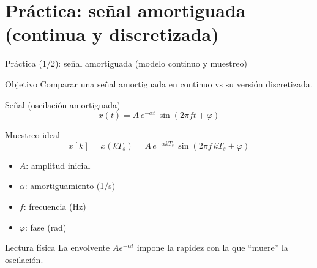 \documentclass[aspectratio=169,10pt]{beamer}
\newcommand{\importantbox}[2][Importante]{%
\begin{alertblock}{#1}#2\end{alertblock}}
\newcommand{\objectivebox}[1]{%
\begin{block}{Objetivo}#1\end{block}}
\begin{document}
\section{Práctica: señal amortiguada (continua y discretizada)}

\begin{frame}{Práctica (1/2): señal amortiguada (modelo continuo y muestreo)}
\small

\objectivebox{
Comparar una señal amortiguada en continuo vs su versión discretizada.
}

\begin{block}{Señal (oscilación amortiguada)}
\[
x(t)=A\,e^{-\alpha t}\,\sin(2\pi f t+\varphi)
\]
\end{block}

\begin{block}{Muestreo ideal}
\[
x[k]=x(kT_s)=A\,e^{-\alpha kT_s}\,\sin(2\pi f\,kT_s+\varphi)
\]
\end{block}

\begin{itemize}
\item $A$: amplitud inicial
\item $\alpha$: amortiguamiento (1/s)
\item $f$: frecuencia (Hz)
\item $\varphi$: fase (rad)
\end{itemize}

\importantbox[Lectura física]{
La envolvente $A e^{-\alpha t}$ impone la rapidez con la que ``muere'' la oscilación.
}
\end{frame}
\end{document}
